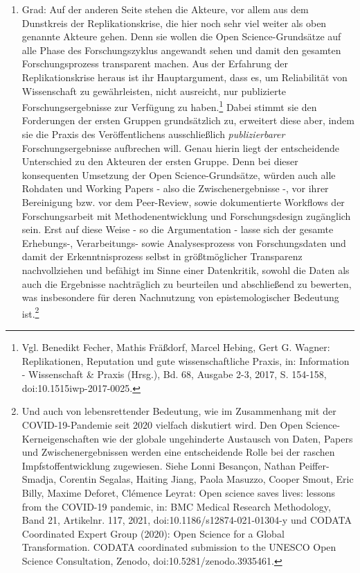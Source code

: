 \begin{enumerate}
\item Grad: Auf der anderen Seite stehen die Akteure, vor allem aus dem Dunstkreis der Replikationskrise, die hier noch sehr viel weiter als oben genannte Akteure gehen. Denn sie wollen die Open Science-Grundsätze auf alle Phase des Forschungszyklus angewandt sehen und damit den gesamten Forschungsprozess transparent machen. Aus der Erfahrung der Replikationskrise heraus ist ihr Hauptargument, dass es, um Reliabilität von Wissenschaft zu gewährleisten, nicht ausreicht, nur publizierte Forschungsergebnisse zur Verfügung zu haben.\footnote{Vgl. Benedikt Fecher, Mathis Fräßdorf, Marcel Hebing, Gert G. Wagner: Replikationen, Reputation und gute wissenschaftliche Praxis, in: Information - Wissenschaft \& Praxis (Hrsg.), Bd. 68, Ausgabe 2-3, 2017, S. 154-158, doi:10.1515\/iwp-2017-0025.} Dabei stimmt sie den Forderungen der ersten Gruppen grundsätzlich zu, erweitert diese aber, indem sie die Praxis des Veröffentlichens ausschließlich \textit{publizierbarer} Forschungsergebnisse aufbrechen will. Genau hierin liegt der entscheidende Unterschied zu den Akteuren der ersten Gruppe. Denn bei dieser konsequenten Umsetzung der Open Science-Grundsätze, würden auch alle Rohdaten und Working Papers - also die Zwischenergebnisse -, vor ihrer Bereinigung bzw. vor dem Peer-Review, sowie dokumentierte Workflows der Forschungsarbeit mit Methodenentwicklung und Forschungsdesign zugänglich sein. Erst auf diese Weise - so die Argumentation - lasse sich der gesamte Erhebungs-, Verarbeitungs- sowie Analysesprozess von Forschungsdaten und damit der Erkenntnisprozess selbst in größtmöglicher Transparenz nachvollziehen und befähigt im Sinne einer Datenkritik, sowohl die Daten als auch die Ergebnisse nachträglich zu beurteilen und abschließend zu bewerten, was insbesondere für deren Nachnutzung von epistemologischer Bedeutung ist.\footnote{Und auch von lebensrettender Bedeutung, wie im Zusammenhang mit der COVID-19-Pandemie seit 2020 vielfach diskutiert wird. Den Open Science-Kerneigenschaften wie der globale ungehinderte Austausch von Daten, Papers und Zwischenergebnissen werden eine entscheidende Rolle bei der raschen Impfstoffentwicklung zugewiesen. Siehe Lonni Besançon, Nathan Peiffer-Smadja, Corentin Segalas, Haiting Jiang, Paola Masuzzo, Cooper Smout, Eric Billy, Maxime Deforet, Clémence Leyrat: Open science saves lives: lessons from the COVID-19 pandemic, in: BMC Medical Research Methodology, Band 21, Artikelnr. 117, 2021, doi:10.1186/s12874-021-01304-y und CODATA Coordinated Expert Group (2020): Open Science for a Global Transformation. CODATA coordinated submission to the UNESCO Open Science Consultation, Zenodo, doi:10.5281/zenodo.3935461.} 
\end{enumerate}  

